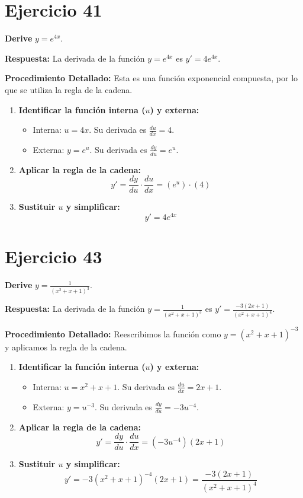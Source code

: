 \documentclass[12pt, a4paper]{article}
\begin{document}
\section{Ejercicio 41}
\textbf{Derive} $y=e^{4x}$.

\textbf{Respuesta:}
La derivada de la función $y=e^{4x}$ es $y'=4e^{4x}$.

\textbf{Procedimiento Detallado:}
Esta es una función exponencial compuesta, por lo que se utiliza la regla de la cadena.
\begin{enumerate}
    \item \textbf{Identificar la función interna ($u$) y externa:}
    \begin{itemize}
        \item Interna: $u=4x$. Su derivada es $\frac{du}{dx}=4$.
        \item Externa: $y=e^u$. Su derivada es $\frac{dy}{du}=e^u$.
    \end{itemize}
    \item \textbf{Aplicar la regla de la cadena:}
    \[y'=\frac{dy}{du}\cdot\frac{du}{dx}=(e^u)\cdot(4)\]
    \item \textbf{Sustituir $u$ y simplificar:}
    \[y'=4e^{4x}\]
\end{enumerate}

\section{Ejercicio 43}
\textbf{Derive} $y=\frac{1}{(x^2+x+1)^3}$.

\textbf{Respuesta:}
La derivada de la función $y=\frac{1}{(x^2+x+1)^3}$ es $y'=\frac{-3(2x+1)}{(x^2+x+1)^4}$.

\textbf{Procedimiento Detallado:}
Reescribimos la función como $y=(x^2+x+1)^{-3}$ y aplicamos la regla de la cadena.
\begin{enumerate}
    \item \textbf{Identificar la función interna ($u$) y externa:}
    \begin{itemize}
        \item Interna: $u=x^2+x+1$. Su derivada es $\frac{du}{dx}=2x+1$.
        \item Externa: $y=u^{-3}$. Su derivada es $\frac{dy}{du}=-3u^{-4}$.
    \end{itemize}
    \item \textbf{Aplicar la regla de la cadena:}
    \[y'=\frac{dy}{du}\cdot\frac{du}{dx}=(-3u^{-4})(2x+1)\]
    \item \textbf{Sustituir $u$ y simplificar:}
    \[y'=-3(x^2+x+1)^{-4}(2x+1)=\frac{-3(2x+1)}{(x^2+x+1)^4}\]
\end{enumerate}
\end{document}
